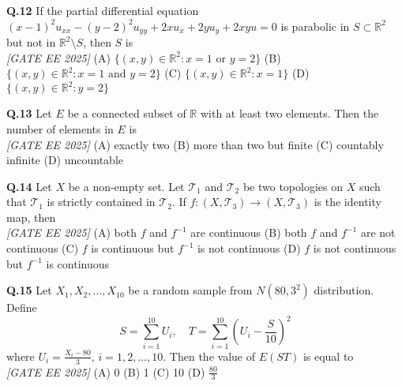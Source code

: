 \documentclass[11pt]{article}
\begin{document}
\begin{flushleft}
\newline
\newline
\textbf{Q.12} If the partial differential equation $(x - 1)^2 u_{xx} - (y - 2)^2 u_{yy} + 2xu_x + 2yu_y + 2xyu = 0$ is parabolic in $S \subset \mathbb{R}^2$ but not in $\mathbb{R}^2 \setminus S$, then $S$ is
\\[1ex] \textit{[GATE EE 2025]}
\newline
(A) $\{(x, y) \in \mathbb{R}^2 : x = 1 \text{ or } y = 2 \}$ \hspace{0.5cm} 
(B) $\{(x, y) \in \mathbb{R}^2 : x = 1 \text{ and } y = 2 \}$ \newline
(C) $\{(x, y) \in \mathbb{R}^2 : x = 1 \}$ \hspace{1.5cm} 
(D) $\{(x, y) \in \mathbb{R}^2 : y = 2 \}$
\newline
\newline

\textbf{Q.13} Let $E$ be a connected subset of $\mathbb{R}$ with at least two elements. Then the number of elements in $E$ is
\\[1ex] \textit{[GATE EE 2025]}
\newline
(A) exactly two \hspace{1cm} (B) more than two but finite \hspace{1cm} (C) countably infinite \hspace{1cm} (D) uncountable
\newline
\newline

\textbf{Q.14} Let $X$ be a non-empty set. Let $\mathcal{T}_1$ and $\mathcal{T}_2$ be two topologies on $X$ such that $\mathcal{T}_1$ is strictly contained in $\mathcal{T}_2$. If $f : (X, \mathcal{T}_3) \rightarrow (X, \mathcal{T}_3)$ is the identity map, then
\\[1ex] \textit{[GATE EE 2025]}
\newline
(A) both $f$ and $f^{-1}$ are continuous \hspace{1cm}
(B) both $f$ and $f^{-1}$ are not continuous \newline
(C) $f$ is continuous but $f^{-1}$ is not continuous \hspace{0.5cm}
(D) $f$ is not continuous but $f^{-1}$ is continuous
\newline
\newline

\textbf{Q.15} Let $X_1, X_2, \dots, X_{10}$ be a random sample from $N(80, 3^2)$ distribution. Define
\[
S = \sum_{i=1}^{10} U_i, \quad T = \sum_{i=1}^{10} \left(U_i - \frac{S}{10} \right)^2
\]
where $U_i = \frac{X_i - 80}{3}, \, i = 1, 2, \dots, 10$. Then the value of $E(ST)$ is equal to
\\[1ex] \textit{[GATE EE 2025]}
\newline
(A) 0 \hspace{1cm} (B) 1 \hspace{1cm} (C) 10 \hspace{1cm} (D) $\frac{80}{3}$
\newline
\end{flushleft}
\end{document}
